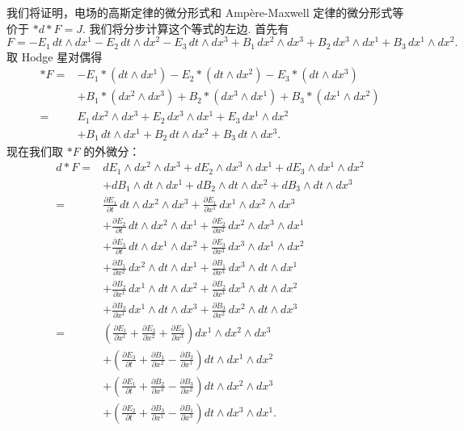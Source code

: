 \begin{center}
\end{center}

我们将证明，电场的高斯定律的微分形式和 Ampère-Maxwell 定律的微分形式等价于 $\ast d\ast F=J$. 我们将分步计算这个等式的左边. 首先有
\[
F=-E_1\,dt\wedge dx^1-E_2\,dt\wedge dx^2-E_3\,dt\wedge dx^3+B_1\,dx^2\wedge dx^3+B_2\,dx^3\wedge dx^1+B_3\,dx^1\wedge dx^2 .
\]
取 Hodge 星对偶得
\[
\begin{aligned}
\ast F={}&-E_1\ast(dt\wedge dx^1)-E_2\ast(dt\wedge dx^2)-E_3\ast(dt\wedge dx^3)\\
&+B_1\ast(dx^2\wedge dx^3)+B_2\ast(dx^3\wedge dx^1)+B_3\ast(dx^1\wedge dx^2)\\
={}&E_1\,dx^2\wedge dx^3+E_2\,dx^3\wedge dx^1+E_3\,dx^1\wedge dx^2\\
&+B_1\,dt\wedge dx^1+B_2\,dt\wedge dx^2+B_3\,dt\wedge dx^3 .
\end{aligned}
\]
现在我们取 $\ast F$ 的外微分：
\[
\begin{aligned}
d\ast F={}&dE_1\wedge dx^2\wedge dx^3+dE_2\wedge dx^3\wedge dx^1+dE_3\wedge dx^1\wedge dx^2\\
&+dB_1\wedge dt\wedge dx^1+dB_2\wedge dt\wedge dx^2+dB_3\wedge dt\wedge dx^3\\
={}&\frac{\partial E_1}{\partial t}\,dt\wedge dx^2\wedge dx^3+\frac{\partial E_1}{\partial x^1}\,dx^1\wedge dx^2\wedge dx^3\\
&+\frac{\partial E_2}{\partial t}\,dt\wedge dx^2\wedge dx^1+\frac{\partial E_2}{\partial x^2}\,dx^2\wedge dx^3\wedge dx^1\\
&+\frac{\partial E_3}{\partial t}\,dt\wedge dx^1\wedge dx^2+\frac{\partial E_3}{\partial x^3}\,dx^3\wedge dx^1\wedge dx^2\\
&+\frac{\partial B_1}{\partial x^2}\,dx^2\wedge dt\wedge dx^1+\frac{\partial B_1}{\partial x^3}\,dx^3\wedge dt\wedge dx^1\\
&+\frac{\partial B_2}{\partial x^1}\,dx^1\wedge dt\wedge dx^2+\frac{\partial B_2}{\partial x^3}\,dx^3\wedge dt\wedge dx^2\\
&+\frac{\partial B_3}{\partial x^1}\,dx^1\wedge dt\wedge dx^3+\frac{\partial B_3}{\partial x^2}\,dx^2\wedge dt\wedge dx^3\\
={}&\left(\frac{\partial E_1}{\partial x^1}+\frac{\partial E_2}{\partial x^2}+\frac{\partial E_3}{\partial x^3}\right)dx^1\wedge dx^2\wedge dx^3\\
&+\left(\frac{\partial E_3}{\partial t}+\frac{\partial B_1}{\partial x^2}-\frac{\partial B_2}{\partial x^1}\right)dt\wedge dx^1\wedge dx^2\\
&+\left(\frac{\partial E_1}{\partial t}+\frac{\partial B_2}{\partial x^3}-\frac{\partial B_3}{\partial x^2}\right)dt\wedge dx^2\wedge dx^3\\
&+\left(\frac{\partial E_2}{\partial t}+\frac{\partial B_3}{\partial x^1}-\frac{\partial B_1}{\partial x^3}\right)dt\wedge dx^3\wedge dx^1 .
\end{aligned}
\]
